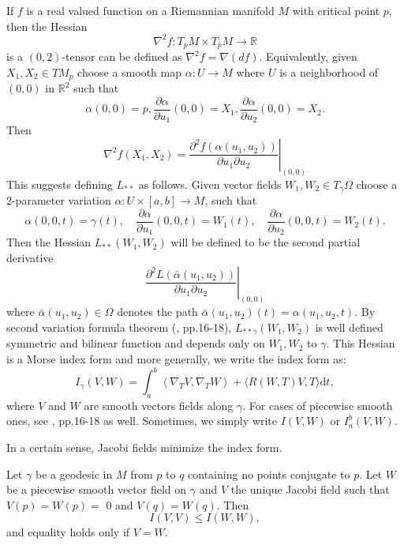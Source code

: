 \documentclass{ctexart}
\begin{document}
If $f$ is a real valued function on a Riemannian manifold $M$ with critical point $p$, then the Hessian
$$
\nabla^2 f: T_p M \times T_p M \rightarrow \mathbb{R}
$$
is a $(0,2)$-tensor can be defined as $\nabla^2 f=\nabla(df)$. Equivalently, given $X_1, X_2 \in T M_p$ choose a smooth map
$\alpha: U\rightarrow M$ where $U$ is a neighborhood of $(0,0)$ in $\mathbb{R}^2$ such that 
$$
\alpha(0,0)=p, \frac{\partial \alpha}{\partial u_1}(0,0)=X_1, \frac{\partial \alpha}{\partial u_2}(0,0)=X_2 .
$$
Then
$$
\nabla^2 f\left(X_1, X_2\right)=\left.\frac{\partial^2 f\left(\alpha\left(u_1, u_2\right)\right)}{\partial u_1 \partial u_2}\right|_{(0,0)}
$$
This suggests defining $L_{* *}$ as follows. Given vector fields $W_1, W_2 \in T_\gamma\Omega$ choose a 2-parameter variation
$\alpha: U \times[a,b] \rightarrow M$, such that
$$
\alpha(0,0, t)=\gamma(t), \quad \frac{\partial \alpha}{\partial u_1}(0,0, t)=W_1(t), \quad \frac{\partial \alpha}{\partial u_2}(0,0, t)=W_2(t) .
$$
Then the Hessian $L_{* *}\left(W_1, W_2\right)$ will be defined to be the second partial derivative
$$
\left.\frac{\partial^2 L\left(\bar{\alpha}\left(u_1, u_2\right)\right)}{\partial u_1 \partial u_2}\right|_{(0,0)}
$$
where $\bar{\alpha}\left(u_1, u_2\right) \in \Omega$ denotes the path $\bar{\alpha}\left(u_1, u_2\right)(t)=\alpha\left(u_1, u_2, t\right)$. 
By second variation formula theorem (\cite{Cheeger2008}, pp.16-18), $L_{* * \gamma}(W_1,W_2)$ is well defined symmetric and bilinear function and depends only on $W_1,W_2$ to $\gamma$. 
This Hessian is a Morse index form and more generally, we write the index form as: 
$$
I_\gamma(V, W)=\int_a^b\left\langle\nabla_T V, \nabla_T W\right\rangle+\langle R(W, T) V, T\rangle\mathrm{d}t,
$$
where $V$ and $W$ are smooth vectors fields along $\gamma$. For cases of piecewise smooth ones, see \cite{Cheeger2008}, pp.16-18 as well. Sometimes, we simply write 
$I(V,W)$ or $I_a^b(V,W)$.

In a certain sense, Jacobi fields minimize the index form. 
\begin{lemma}
  Let $\gamma$ be a geodesic in $M$ from $p$ to $q$ containing no points conjugate to $p$. Let $W$ be a piecewise smooth vector field on $\gamma$ 
  and $V$ the unique Jacobi field such that $V(p)=W(p)=$ 0 and $V(q)=W(q)$. Then 
  $$
  I(V, V) \leq I(W, W), 
  $$
  and equality holds only if $V=W$.
\end{lemma}
\end{document}
